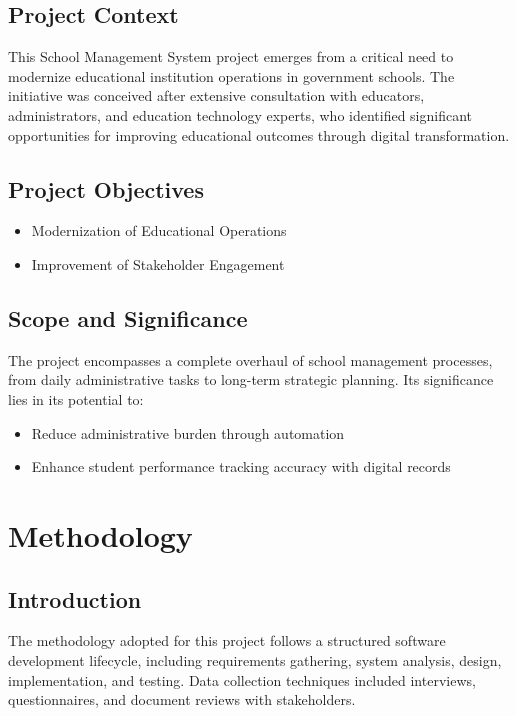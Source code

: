 \documentclass[12pt,a4paper]{report}
\begin{document}
\section{Project Context}
This School Management System project emerges from a critical need to modernize educational institution operations in government schools. The initiative was conceived after extensive consultation with educators, administrators, and education technology experts, who identified significant opportunities for improving educational outcomes through digital transformation.

\section{Project Objectives}
\begin{itemize}
    \item Modernization of Educational Operations
    \item Improvement of Stakeholder Engagement
\end{itemize}

\section{Scope and Significance}
The project encompasses a complete overhaul of school management processes, from daily administrative tasks to long-term strategic planning. Its significance lies in its potential to:
\begin{itemize}
    \item Reduce administrative burden through automation
    \item Enhance student performance tracking accuracy with digital records
\end{itemize}

\chapter{Methodology}
\section{Introduction}
The methodology adopted for this project follows a structured software development lifecycle, including requirements gathering, system analysis, design, implementation, and testing. Data collection techniques included interviews, questionnaires, and document reviews with stakeholders.
\end{document}
